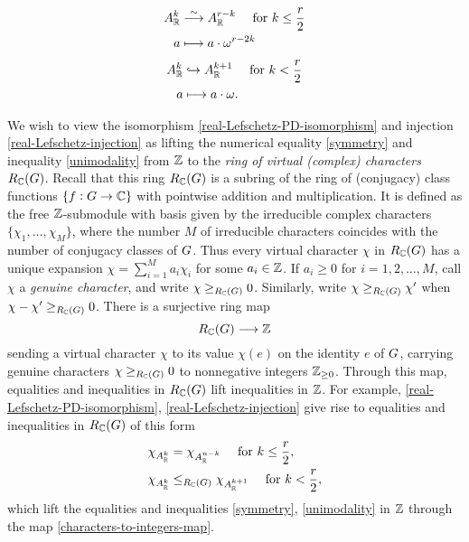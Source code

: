 \begin{align}
    \label{real-Lefschetz-PD-isomorphism}
    A_{\mathbb{R}}^{k} &\overset{\sim}{\longrightarrow} A_{\mathbb{R}}^{r-k} 
     \quad \text{ for }k \leq \frac{r}{2} \nonumber \\
    a &\longmapsto  a \cdot \omega^{r-2k}
\end{align}
\begin{align}
  \label{real-Lefschetz-injection}
        A_{\mathbb{R}}^{k} &\hookrightarrow A_{\mathbb{R}}^{k+1} \quad \text{ for }k < \frac{r}{2} \nonumber \\
        a & \longmapsto  a \cdot \omega. 
\end{align}

We wish to view the isomorphism \eqref{real-Lefschetz-PD-isomorphism} and injection \eqref{real-Lefschetz-injection}
as lifting the numerical equality \eqref{symmetry} and inequality \eqref{unimodality} from $\mathbb{Z}$ to the {\it ring of virtual (complex) characters} $R_{\mathbb{C}}(G)$.  Recall that this ring $R_{\mathbb{C}}(G)$ is a subring of the ring of (conjugacy) class functions $\{f: G \rightarrow \mathbb{C}\}$ with pointwise addition and multiplication.  It is defined as the free $\mathbb{Z}$-submodule with basis given by the irreducible complex characters $\{ \chi_1,\ldots,\chi_M\}$, where the number $M$ of irreducible characters coincides with the number of conjugacy classes of $G$.  Thus every virtual character $\chi$ in $R_{\mathbb{C}}(G)$ has a unique expansion $\chi = \sum_{i=1}^M a_i \chi_i$ for some $a_i \in \mathbb{Z}$.  If $a_i \geq 0$ for $i=1,2,\ldots,M$,
call $\chi$ a {\it genuine character}, and write $\chi \geq_{R_{\mathbb{C}}(G)} 0$.
Similarly, write $\chi \geq_{R_{\mathbb{C}}(G)} \chi'$ when $\chi-\chi' \geq_{R_{\mathbb{C}}(G)} 0$.
There is a surjective ring map
\begin{equation}
\label{characters-to-integers-map}
R_{\mathbb{C}}(G) \longrightarrow \mathbb{Z}
\end{equation}
sending a virtual character $\chi$ to its value $\chi(e)$ on the identity $e$ of $G$, carrying genuine characters $\chi \geq_{R_{\mathbb{C}}(G)} 0$ to nonnegative integers $\mathbb{Z}_{\geq 0}$.  Through this map, equalities and inequalities in $R_{\mathbb{C}}(G)$ lift inequalities in $\mathbb{Z}$.  For example,
\eqref{real-Lefschetz-PD-isomorphism}, \eqref{real-Lefschetz-injection}
give rise to equalities and inequalities in $R_{\mathbb{C}}(G)$ of this form
\begin{align}
\label{character-symmetry}
\chi_{A_{\mathbb{R}}^k}&=\chi_{A_{\mathbb{R}}^{n-k}} \quad \text{
for }k \leq \frac{r}{2},\\
\label{character-unimodality}
\chi_{A_{\mathbb{R}}^k} &\leq_{R_{\mathbb{C}}(G)} \chi_{A_{\mathbb{R}}^{k+1}}
\quad \text{ for }k < \frac{r}{2},
\end{align}
which lift the equalities and inequalities \eqref{symmetry}, \eqref{unimodality} in $\mathbb{Z}$
 through the map \eqref{characters-to-integers-map}.


